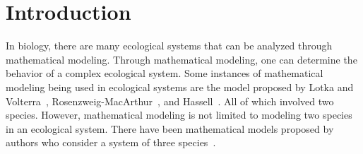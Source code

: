 \section{Introduction}\label{sec:introduction}

In biology, there are many ecological systems that can be analyzed through mathematical modeling. Through mathematical modeling, one can determine the behavior of a complex ecological system. Some instances of mathematical modeling being used in ecological systems are the model proposed by Lotka and Volterra~\cite{brauer_castillo-chávez_2012}, Rosenzweig-MacArthur~\cite{doi:10.1086/282272}, and Hassell~\cite{hassell2020dynamics}. All of which involved two species. However, mathematical modeling is not limited to modeling two species in an ecological system. There have been mathematical models proposed by authors who consider a system of three species~\cite{JANA2021100942,FREEDMAN1977257,doi:10.1080/02286203.2020.1839168}.